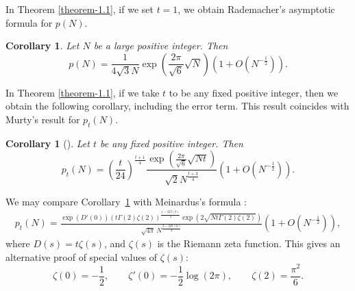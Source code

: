 \documentclass[11pt]{amsart}
\theoremstyle{plain}
\newtheorem{corollary}[theorem]{Corollary}
\numberwithin{equation}{section}
\begin{document}
	In Theorem \ref{theorem-1.1}, if we set $t = 1$, we obtain Rademacher's asymptotic formula \cite{rademacher1938partition} for $p(N)$.
	\begin{corollary}\label{corollary-1.3}
		Let $N$ be a large positive integer. Then  
		\begin{equation*}
			p(N)=\frac{1}{4\sqrt{3}N}\exp\left(\frac{2\pi}{\sqrt{6}}\sqrt{N}\right)\left(1+O\left(N^{-\frac{1}{2}}\right)\right).
		\end{equation*}
	\end{corollary}
	In Theorem \ref{theorem-1.1}, if we take $t$ to be any fixed positive integer, then we obtain the following corollary, including the error term. This result coincides with Murty's result \cite{murty2013partition} for $p_t(N)$.
	\begin{corollary}[{\cite[Theorem 4]{murty2013partition}}]\label{corollary-1.4}
		Let $t$ be any fixed
		positive integer. Then
		\begin{equation*}
			p_{t}(N)=\left(\frac{t}{24}\right)^{\frac{t+1}{4}}\frac{\exp\left(\frac{2\pi}{\sqrt{6}}\sqrt{Nt}\right)}{\sqrt{2}N^{\frac{t+3}{4}}}\left(1+O\left(N^{-\frac{1}{2}}\right)\right).
		\end{equation*}  
	\end{corollary}
	We may compare Corollary~\ref{corollary-1.4} with Meinardus's formula \cite{meinardus1953}:
	\begin{align*}
		p_t(N)=\frac{\exp\left(D'(0)\right)\left(t\Gamma(2)\zeta(2)\right)^{\frac{1-2D(0)}{4}}\exp\left(2\sqrt{Nt\Gamma(2)\zeta(2)}\right)}{\sqrt{4\pi}\,N^{\frac{3-2D(0)}{4}}} \left(1+O\left(N^{-\frac{1}{2}}\right)\right), 
	\end{align*}
	where $D(s)=t\zeta(s)$, and $\zeta(s)$ is the Riemann zeta function. This gives an alternative proof of special values of $\zeta(s)$: 
	$$
	\zeta(0)=-\frac{1}{2}, \qquad
	\zeta'(0)=-\frac{1}{2}\log(2\pi), \qquad
	\zeta(2)=\frac{\pi^2}{6}.
	$$ 
	
\end{document}
